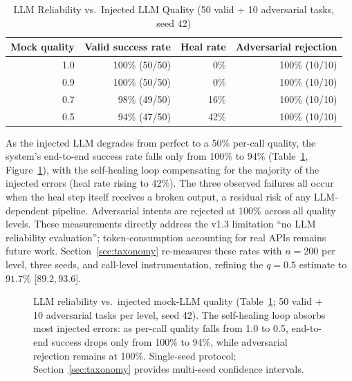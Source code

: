 ﻿\documentclass[12pt,a4paper]{article}
\begin{document}
\begin{table}[H]
\centering
\caption{LLM Reliability vs.\ Injected LLM Quality (50 valid + 10 adversarial tasks, seed 42)}
\label{tab:reliability}
\small
\begin{tabular}{@{}rrrr@{}}
\toprule
\textbf{Mock quality} & \textbf{Valid success rate} & \textbf{Heal rate} & \textbf{Adversarial rejection} \\
\midrule
1.0 & 100\% (50/50) & 0\%  & 100\% (10/10) \\
0.9 & 100\% (50/50) & 0\%  & 100\% (10/10) \\
0.7 &  98\% (49/50) & 16\% & 100\% (10/10) \\
0.5 &  94\% (47/50) & 42\% & 100\% (10/10) \\
\bottomrule
\end{tabular}
\end{table}

As the injected LLM degrades from perfect to a 50\% per-call quality, the system's end-to-end success rate falls only from 100\% to 94\% (Table~\ref{tab:reliability}, Figure~\ref{fig:reliability}), with the self-healing loop compensating for the majority of the injected errors (heal rate rising to 42\%). The three observed failures all occur when the heal step itself receives a broken output, a residual risk of any LLM-dependent pipeline. Adversarial intents are rejected at 100\% across all quality levels. These measurements directly address the v1.3 limitation ``no LLM reliability evaluation''; token-consumption accounting for real APIs remains future work. Section~\ref{sec:taxonomy} re-measures these rates with $n{=}200$ per level, three seeds, and call-level instrumentation, refining the $q{=}0.5$ estimate to $91.7\%$ [$89.2, 93.6$].

\begin{figure}[H]
\centering
{}
\caption{LLM reliability vs.\ injected mock-LLM quality (Table~\ref{tab:reliability}; 50 valid $+$ 10 adversarial tasks per level, seed 42). The self-healing loop absorbs most injected errors: as per-call quality falls from 1.0 to 0.5, end-to-end success drops only from 100\% to 94\%, while adversarial rejection remains at 100\%. Single-seed protocol; Section~\ref{sec:taxonomy} provides multi-seed confidence intervals.}
\label{fig:reliability}
\end{figure}
\end{document}
